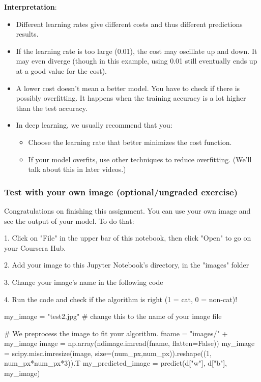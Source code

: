 {{{\color{red}\textbf {Interpretation}}:
\begin{itemize}
\item Different learning rates give different costs and thus different predictions results.
\item If the learning rate is too large (0.01), the cost may oscillate up and down. It may even diverge (though in this example, using 0.01 still eventually ends up at a good value for the cost).
\item A lower cost doesn't mean a better model. You have to check if there is possibly overfitting. It happens when the training accuracy is a lot higher than the test accuracy.
\item In deep learning, we usually recommend that you:
\begin{itemize}
\item Choose the learning rate that better minimizes the cost function.
\item If your model overfits, use other techniques to reduce overfitting. (We'll talk about this in later videos.)
\end{itemize}
\end{itemize}
}

\subsubsection{Test with your own image (optional/ungraded exercise)}
Congratulations on finishing this assignment. You can use your own image and see the output of your model. To do that:

1. Click on "File" in the upper bar of this notebook, then click "Open" to go on your Coursera Hub.

2. Add your image to this Jupyter Notebook's directory, in the "images" folder

3. Change your image's name in the following code

4. Run the code and check if the algorithm is right (1 = cat, 0 = non-cat)!


\begin{mypython}
my_image = "test2.jpg"   # change this to the name of your image file 

# We preprocess the image to fit your algorithm.
fname = "images/" + my_image
image = np.array(ndimage.imread(fname, flatten=False))
my_image = scipy.misc.imresize(image, size=(num_px,num_px)).reshape((1, num_px*num_px*3)).T
my_predicted_image = predict(d["w"], d["b"], my_image)


\end{mypython}}
